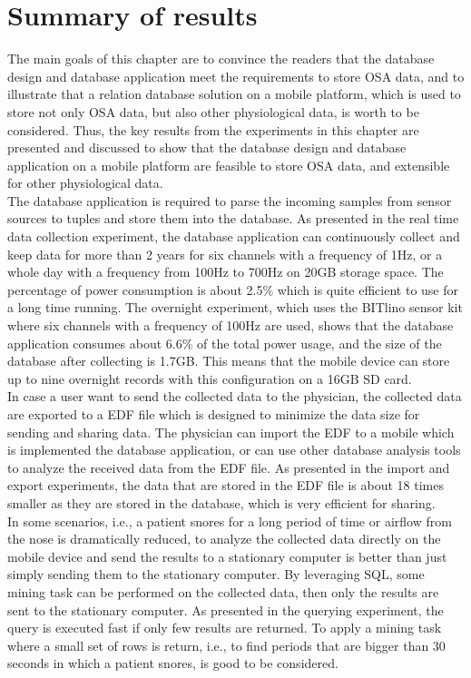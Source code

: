 \section{Summary of results}
The main goals of this chapter are to convince the readers that the database design and database application meet the requirements to store OSA data, and to illustrate that a relation database solution on a mobile platform, which is used to store not only OSA data, but also other physiological data, is worth to be considered. Thus, the key results from the experiments in this chapter are presented and discussed to show that the database design and database application on a mobile platform are feasible to store OSA data, and extensible for other physiological data.\\
The database application is required to parse the incoming samples from sensor sources to tuples and store them into the database. As presented in the real time data collection experiment, the database application can continuously collect and keep data for more than 2 years for six channels with a frequency of 1Hz, or a whole day with a frequency from 100Hz to 700Hz on 20GB storage space. The percentage of power consumption is about 2.5\% which is quite efficient to use for a long time running. The overnight experiment, which uses the BITlino sensor kit where six channels with a frequency of 100Hz are used, shows that the database application consumes about 6.6\% of the total power usage, and the size of the database after collecting is 1.7GB. This means that the mobile device can store up to nine overnight records with this configuration on a 16GB SD card.\\
In case a user want to send the collected data to the physician, the collected data are exported to a EDF file which is designed to minimize the data size for sending and sharing data. The physician can import the EDF to a mobile which is implemented the database application, or can use other database analysis tools to analyze the received data from the EDF file. As presented in the import and export experiments, the data that are stored in the EDF file is about 18 times smaller as they are stored in the database, which is very efficient for sharing.\\
In some scenarios, i.e., a patient snores for a long period of time or airflow from the nose is dramatically reduced, to analyze the collected data directly on the mobile device and send the results to a stationary computer is better than just simply sending them to the stationary computer. By leveraging SQL, some mining task can be performed on the collected data, then only the results are sent to the stationary computer. As presented in the querying experiment, the query is executed fast if only few results are returned. To apply a mining task where a small set of rows is return, i.e., to find periods that are bigger than 30 seconds in which a patient snores, is good to be considered.\\
